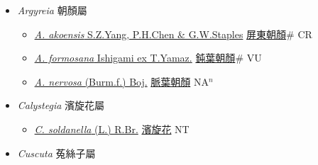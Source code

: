 
  \begin{itemize}
 \item[] \textit{Argyreia} 朝顏屬
                    
  \begin{itemize}
        \item[] \href{http://www.theplantlist.org/tpl1.1/search?q=Argyreia+akoensis}{\textit{A. akoensis} S.Z.Yang, P.H.Chen \& G.W.Staples}   \href{\detokenize{http://taibnet.sinica.edu.tw/chi/taibnet_species_list.php?T2=屏東朝顏&T2_new_value=true&fr=y}}{屏東朝顏}\# CR
        \item[] \href{http://www.theplantlist.org/tpl1.1/search?q=Argyreia+formosana}{\textit{A. formosana} Ishigami ex T.Yamaz.}   \href{\detokenize{http://taibnet.sinica.edu.tw/chi/taibnet_species_list.php?T2=鈍葉朝顏&T2_new_value=true&fr=y}}{鈍葉朝顏}\# VU
        \item[] \href{http://www.theplantlist.org/tpl1.1/search?q=Argyreia+nervosa}{\textit{A. nervosa} (Burm.f.) Boj.}   \href{\detokenize{http://taibnet.sinica.edu.tw/chi/taibnet_species_list.php?T2=脈葉朝顏&T2_new_value=true&fr=y}}{脈葉朝顏} NA$^n$
  \end{itemize}
 \item[] \textit{Calystegia} 濱旋花屬
                    
  \begin{itemize}
        \item[] \href{http://www.theplantlist.org/tpl1.1/search?q=Calystegia+soldanella}{\textit{C. soldanella} (L.) R.Br.}   \href{\detokenize{http://taibnet.sinica.edu.tw/chi/taibnet_species_list.php?T2=濱旋花&T2_new_value=true&fr=y}}{濱旋花} NT
  \end{itemize}
 \item[] \textit{Cuscuta} 菟絲子屬
                    

\end{itemize}
